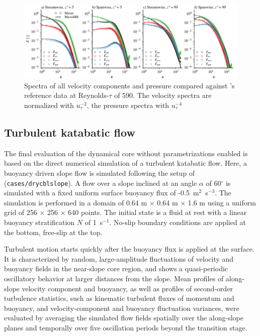 \documentclass[gmd,manuscript]{copernicus}
\begin{document}
\begin{figure}[t]
\vspace*{2mm}
\begin{center}
\includegraphics[width=16.6cm]{figs/gmd_m590_spectra_4x1.pdf}
\end{center}
\caption{Spectra of all velocity components and pressure compared against \citet{Moser1999}'s reference data at Reynolds-$\tau$ of 590. The velocity spectra are normalized with $u_\tau^{-2}$, the pressure spectra with $u_\tau^{-4}$}\label{fig:moser_spectra}
\end{figure}

\subsection{Turbulent katabatic flow}
The final evaluation of the dynamical core without parametrizations enabled is based on the direct numerical simulation of a turbulent katabatic flow. Here, a buoyancy driven slope flow is simulated following the setup of \citet{Fedorovich2009} (\texttt{cases/drycblslope}). A flow over a slope inclined at an angle $\alpha$ of 60$^\circ$ is simulated with a fixed uniform surface buoyancy flux of -0.5~m$^2$~s$^{-3}$. The simulation is performed in a domain of 0.64 m $\times$ 0.64 m $\times$ 1.6 m using a uniform grid of 256 $\times$ 256 $\times$ 640 points. The initial state is a fluid at rest with a linear buoyancy stratification $N$ of 1~s$^{-1}$. No-slip boundary conditions are applied at the bottom, free-slip at the top.

Turbulent motion starts quickly after the buoyancy flux is applied at the surface. It is characterized by random, large-amplitude fluctuations of velocity and buoyancy fields in the near-slope core region, and shows a quasi-periodic oscillatory behavior at larger distances from the slope. Mean profiles of along-slope velocity component and buoyancy, as well as profiles of second-order turbulence statistics, such as kinematic turbulent fluxes of momentum and buoyancy, and velocity-component and buoyancy fluctuation variances, were evaluated by averaging the simulated flow fields spatially over the along-slope planes and temporally over five oscillation periods beyond the transition stage.
\end{document}
